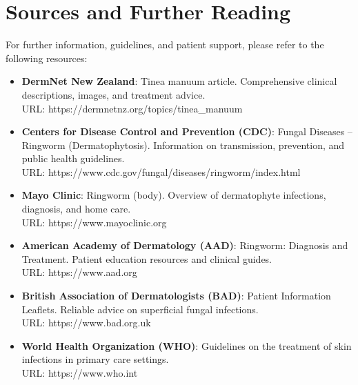 \section*{Sources and Further Reading}
For further information, guidelines, and patient support, please refer to the following resources:
\begin{itemize}
    \item \textbf{DermNet New Zealand}: Tinea manuum article. Comprehensive clinical descriptions, images, and treatment advice. \\ URL: https://dermnetnz.org/topics/tinea\_manuum
    \item \textbf{Centers for Disease Control and Prevention (CDC)}: Fungal Diseases -- Ringworm (Dermatophytosis). Information on transmission, prevention, and public health guidelines. \\ URL: https://www.cdc.gov/fungal/diseases/ringworm/index.html
    \item \textbf{Mayo Clinic}: Ringworm (body). Overview of dermatophyte infections, diagnosis, and home care. \\ URL: https://www.mayoclinic.org
    \item \textbf{American Academy of Dermatology (AAD)}: Ringworm: Diagnosis and Treatment. Patient education resources and clinical guides. \\ URL: https://www.aad.org
    \item \textbf{British Association of Dermatologists (BAD)}: Patient Information Leaflets. Reliable advice on superficial fungal infections. \\ URL: https://www.bad.org.uk
    \item \textbf{World Health Organization (WHO)}: Guidelines on the treatment of skin infections in primary care settings. \\ URL: https://www.who.int
\end{itemize}